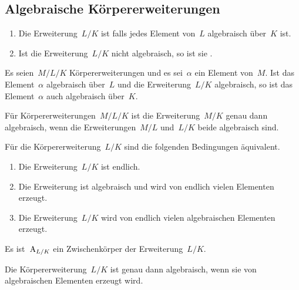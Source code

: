 \clearpage





\subsection{Algebraische Körpererweiterungen}

\begin{definition}
  \leavevmode
  \begin{enumerate}
    \item
      Die Erweiterung~$L/K$ ist  falls jedes Element von~$L$ algebraisch über~$K$ ist.
    \item
      Ist die Erweiterung~$L/K$ nicht algebraisch, so ist sie .
  \end{enumerate}
\end{definition}

\begin{lemma}
  Es seien~$M/L/K$ Körpererweiterungen und es sei~$\alpha$ ein Element von~$M$.
  Ist das Element~$\alpha$ algebraisch über~$L$ und die Erweiterung~$L/K$ algebraisch, so ist das Element~$\alpha$ auch algebraisch über~$K$.
\end{lemma}

\begin{proposition}
  Für Körpererweiterungen~$M/L/K$ ist die Erweiterung~$M/K$ genau dann algebraisch, wenn die Erweiterungen~$M/L$ und~$L/K$ beide algebraisch sind.
\end{proposition}

\begin{proposition}
  Für die Körpererweiterung~$L/K$ sind die folgenden Bedingungen äquivalent.
  \begin{enumerate}
    \item
      Die Erweiterung~$L/K$ ist endlich.
    \item
      Die Erweiterung ist algebraisch und wird von endlich vielen Elementen erzeugt.
    \item
      Die Erweiterung~$L/K$ wird von endlich vielen algebraischen Elementen erzeugt.
  \end{enumerate}
\end{proposition}

\begin{corollary}
  Es ist~$\operatorname{A}_{L/K}$ ein Zwischenkörper der Erweiterung~$L/K$.
\end{corollary}

\begin{corollary}
  Die Körpererweiterung~$L/K$ ist genau dann algebraisch, wenn sie von algebraischen Elementen erzeugt wird.
\end{corollary}




